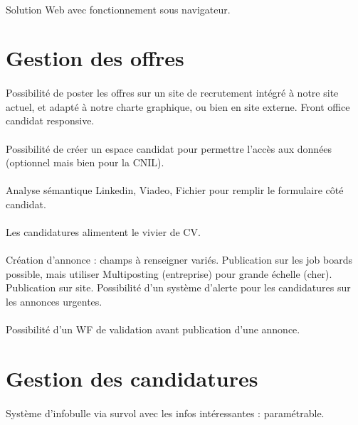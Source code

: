 \documentclass[12pt,twoside]{scrreprt}
\begin{document}
\paragraph{} Solution Web avec fonctionnement sous navigateur.

\section{Gestion des offres}
\paragraph{} Possibilité de poster les offres sur un site de recrutement intégré à notre site actuel, et adapté à notre charte graphique, ou bien en site externe. Front office candidat responsive.
\paragraph{} Possibilité de créer un espace candidat pour permettre l’accès aux données (optionnel mais bien pour la CNIL).
\paragraph{} Analyse sémantique Linkedin, Viadeo, Fichier pour remplir le formulaire côté candidat.
\paragraph{} Les candidatures alimentent le vivier de CV.
\paragraph{} Création d'annonce : champs à renseigner variés. Publication sur les job boards possible, mais utiliser Multiposting (entreprise) pour grande échelle (cher). Publication sur site. Possibilité d'un système d'alerte pour les candidatures sur les annonces urgentes.
\paragraph{} Possibilité d'un WF de validation avant publication d'une annonce.


\section{Gestion des candidatures}

\paragraph{} Système d'infobulle via survol avec les infos intéressantes : paramétrable.
\end{document}
